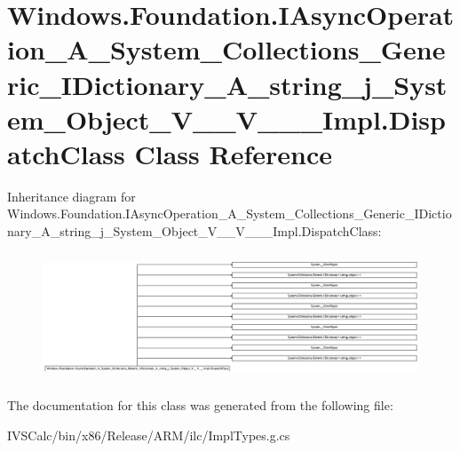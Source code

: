 \hypertarget{class_windows_1_1_foundation_1_1_i_async_operation___a___system___collections___generic___i_dict78b212f57d433c81a7caec622e108c43}{}\section{Windows.\+Foundation.\+I\+Async\+Operation\+\_\+\+A\+\_\+\+System\+\_\+\+Collections\+\_\+\+Generic\+\_\+\+I\+Dictionary\+\_\+\+A\+\_\+string\+\_\+j\+\_\+\+System\+\_\+\+Object\+\_\+\+V\+\_\+\+\_\+\+V\+\_\+\+\_\+\+\_\+\+Impl.\+Dispatch\+Class Class Reference}
\label{class_windows_1_1_foundation_1_1_i_async_operation___a___system___collections___generic___i_dict78b212f57d433c81a7caec622e108c43}
Inheritance diagram for Windows.\+Foundation.\+I\+Async\+Operation\+\_\+\+A\+\_\+\+System\+\_\+\+Collections\+\_\+\+Generic\+\_\+\+I\+Dictionary\+\_\+\+A\+\_\+string\+\_\+j\+\_\+\+System\+\_\+\+Object\+\_\+\+V\+\_\+\+\_\+\+V\+\_\+\+\_\+\+\_\+\+Impl.\+Dispatch\+Class\+:\begin{figure}[H]
\begin{center}
\leavevmode
\includegraphics[height=3.807169cm]{class_windows_1_1_foundation_1_1_i_async_operation___a___system___collections___generic___i_dict78b212f57d433c81a7caec622e108c43}
\end{center}
\end{figure}


The documentation for this class was generated from the following file\+:\begin{DoxyCompactItemize}
\item 
I\+V\+S\+Calc/bin/x86/\+Release/\+A\+R\+M/ilc/Impl\+Types.\+g.\+cs\end{DoxyCompactItemize}
